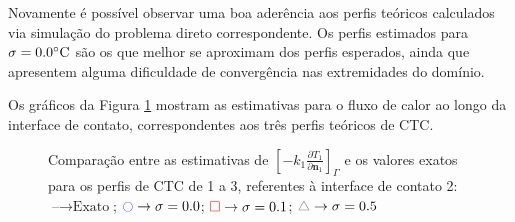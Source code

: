 Novamente é possível observar uma boa aderência aos perfis teóricos calculados via simulação do problema direto correspondente. Os perfis estimados para $\sigma = 0.0\celsius$ são os que melhor se aproximam dos perfis esperados, ainda que apresentem alguma dificuldade de convergência nas extremidades do domínio.

Os gráficos da Figura \ref{figura_fluxo_calor_interface_02} mostram as estimativas para o fluxo de calor ao longo da interface de contato, correspondentes aos três perfis teóricos de CTC.

%
%
\begin{figure}[H]
	\caption{Comparação entre as estimativas de $\left[-k_1 \frac{\partial T_1}{\partial\mathbf{n}_1}\right]_\Gamma$ e os valores exatos para os perfis de CTC de 1 a 3, referentes à interface de contato 2: $\text{--} \rightarrow \text{Exato}$; $\textcolor{blue}{\ocircle} \rightarrow \sigma = 0.0$; $\textcolor{red}{\square} \rightarrow \sigma = 0.1$; $\textcolor{gray}{\triangle} \rightarrow \sigma = 0.5$}
	\label{figura_fluxo_calor_interface_02}
\end{figure}

